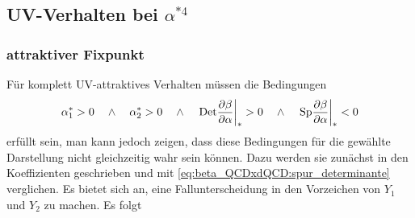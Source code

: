   
  \subsection{UV-Verhalten bei $\alpha^{*4}$}
    \subsubsection{attraktiver Fixpunkt}\label{beta_QCDxdQCD:fix4:UV}
      Für komplett UV-attraktives Verhalten müssen die Bedingungen 
      \begin{equation}
      \alpha_1^* > 0 \quad \land \quad
      \alpha_2^* > 0 \quad \land \quad
      \left. \text{Det} \frac{\partial \beta}{\partial \alpha} \right |_* > 0 \quad \land \quad 
      \left. \text{Sp} \frac{\partial \beta}{\partial \alpha}  \right |_*  < 0 \label{eq:beta_QCDxdQCD:alpha4}
      \end{equation}
      erfüllt sein, man kann jedoch zeigen, dass diese Bedingungen für die 
      gewählte Darstellung nicht gleichzeitig wahr sein können. Dazu werden 
      sie zunächst in den Koeffizienten geschrieben und mit 
      \eqref{eq:beta_QCDxdQCD:spur_determinante} verglichen. Es bietet sich an, 
      eine Fallunterscheidung in den Vorzeichen von $Y_1$ und $Y_2$ zu machen.
      Es folgt 
